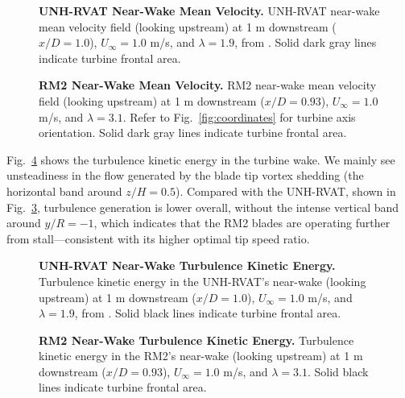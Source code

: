 \documentclass[10pt,letterpaper]{article}
\begin{document}
\begin{figure}

    \caption{{\bf UNH-RVAT Near-Wake Mean Velocity.} UNH-RVAT near-wake mean
        velocity field (looking upstream) at 1 m downstream ($x/D=1.0$),
        $U_\infty=1.0$ m/s, and $\lambda=1.9$, from \cite{Bachant2016-Energies}.
        Solid dark gray lines indicate turbine frontal area.}

    \label{fig:rvat-meancontquiv}
\end{figure}

\begin{figure}

    \caption{{\bf RM2 Near-Wake Mean Velocity.} RM2 near-wake mean velocity
        field (looking upstream) at 1 m downstream ($x/D=0.93$), $U_\infty=1.0$ m/s,
        and $\lambda=3.1$. Refer to Fig.~\ref{fig:coordinates} for turbine axis
        orientation. Solid dark gray lines indicate turbine frontal area.}

    \label{fig:meancontquiv}
\end{figure}

Fig.~\ref{fig:kcont} shows the turbulence kinetic energy in the turbine wake. We
mainly see unsteadiness in the flow generated by the blade tip vortex shedding
(the horizontal band around $z/H=0.5$). Compared with the UNH-RVAT, shown in
Fig.~\ref{fig:rvat-kcont}, turbulence generation is lower overall, without the
intense vertical band around $y/R=-1$, which indicates that the RM2 blades are
operating further from stall---consistent with its higher optimal tip speed
ratio.

\begin{figure}

    \caption{{\bf UNH-RVAT Near-Wake Turbulence Kinetic Energy.} Turbulence
        kinetic energy in the UNH-RVAT's near-wake (looking upstream) at 1 m
        downstream ($x/D=1.0$), $U_\infty=1.0$ m/s, and $\lambda=1.9$, from
        \cite{Bachant2016-Energies}. Solid black lines indicate turbine frontal
        area.}

    \label{fig:rvat-kcont}
\end{figure}

\begin{figure}

    \caption{{\bf RM2 Near-Wake Turbulence Kinetic Energy.} Turbulence kinetic
        energy in the RM2's near-wake (looking upstream) at 1 m downstream
        ($x/D=0.93$), $U_\infty=1.0$ m/s, and $\lambda=3.1$. Solid black lines
        indicate turbine frontal area.}

    \label{fig:kcont}
\end{figure}
\end{document}
